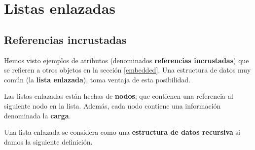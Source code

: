 





\chapter{Listas enlazadas}
\label{lista}

\section{Referencias incrustadas}

Hemos visto ejemplos de atributos (denominados  {\bf referencias incrustadas}) que se refieren a otros objetos  en la sección \ref{embedded}. Una estructura
de datos muy común (la {\bf lista enlazada}), toma ventaja de esta posibilidad.

Las listas enlazadas están hechas de {\bf nodos}, que contienen una referencia
al siguiente nodo en la lista. Además, cada nodo contiene una información
denominada la {\bf carga}.

Una lista enlazada se considera como  una {\bf estructura de datos recursiva} si 
damos la siguiente definición.

